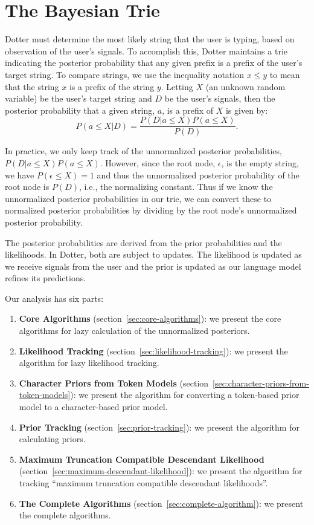 \chapter{The Bayesian Trie}
\label{chap:trie}

Dotter must determine the most likely string that the user is typing, based 
on observation of the user's signals.
To accomplish this, Dotter maintains a trie indicating the posterior probability
that any given prefix is a prefix of the user's target string.
To compare strings, we use the inequality notation $x \leq y$ to mean that the string $x$ is a prefix of the string $y$.
Letting $X$ (an unknown random variable) be the user's target string and $D$ be the user's signals, then the posterior probability 
that a given string, $a$, is a prefix of $X$ is given by:
$$
P(a \leq X | D) = \frac{P(D | a \leq X) P(a \leq X)}{P(D)}.
$$

In practice, we only keep track of the unnormalized posterior probabilities, $P(D | a \leq X) P(a \leq X)$.
However, since the root node, $\epsilon$, is the empty string, we have $P(\epsilon \leq X) = 1$ 
and thus the unnormalized posterior probability of the root node is $P(D)$, i.e., the normalizing constant.
Thus if we know the unnormalized posterior probabilities in our trie, we can convert these to normalized
posterior probabilities by dividing by the root node's unnormalized posterior probability.

The posterior probabilities are derived from the prior probabilities and the likelihoods.
In Dotter, both are subject to updates. The likelihood is updated as we receive signals from the user
and the prior is updated as our language model refines its predictions.

Our analysis has six parts:
\begin{enumerate}
    \item \textbf{Core Algorithms} (section~\ref{sec:core-algorithms}): we present the core algorithms for lazy
    calculation of the unnormalized posteriors.
    \item \textbf{Likelihood Tracking} (section~\ref{sec:likelihood-tracking}): we present the algorithm for lazy likelihood tracking.
    \item \textbf{Character Priors from Token Models} (section~\ref{sec:character-priors-from-token-models}): we present the algorithm for converting a token-based prior model to a character-based prior model.
    \item \textbf{Prior Tracking} (section~\ref{sec:prior-tracking}): we present the algorithm for calculating priors.
    \item \textbf{Maximum Truncation Compatible Descendant Likelihood} (section~\ref{sec:maximum-descendant-likelihood}): we present the algorithm for tracking ``maximum truncation compatible descendant likelihoods''.
    \item \textbf{The Complete Algorithms} (section~\ref{sec:complete-algorithm}): we present the complete algorithms.
\end{enumerate}

